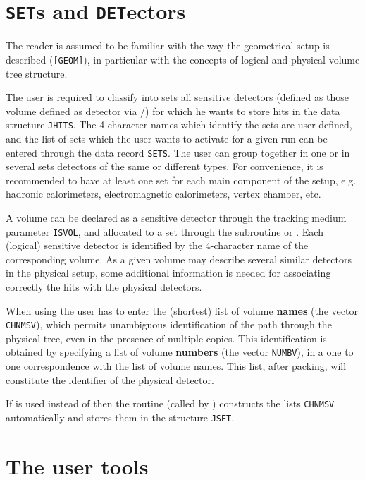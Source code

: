 \section{{\tt SET}s and {\tt DET}ectors}

The reader is assumed to be familiar with the way the
geometrical setup is described ({\tt [GEOM]}), in particular
with the concepts of logical and physical volume tree structure.

The user is required to classify into sets all sensitive detectors
(defined as those volume defined as detector via /)
for which he wants to store hits in the data structure {\tt JHITS}.
The 4-character names which identify the sets are user defined,
and the list of sets
which the user wants to activate for a given run can be entered
through the data record {\tt SETS}.
The user can group together in one or in several sets
detectors of the same or different types. For convenience,
it is recommended to have at least one set for
each main component of the setup, e.g. hadronic calorimeters,
electromagnetic calorimeters, vertex chamber, etc.

A volume can be declared as a sensitive detector through the tracking
medium parameter {\tt ISVOL},
and allocated to a set through the subroutine  or
.
Each (logical) sensitive detector is identified by the 4-character
name of the corresponding volume. As a given volume
may describe several similar detectors in the physical setup,
some additional information is needed for associating
correctly the hits with the physical detectors.

When using  the user has to enter the (shortest) list of volume
{\bf names} (the vector {\tt CHNMSV}), which permits unambiguous
identification of the path through the physical tree,
even in the presence of multiple copies.
This identification is obtained by specifying a list of volume
{\bf numbers} (the vector {\tt NUMBV}), in a one to one
correspondence with the list of volume names.
This list, after packing, will constitute the
identifier of the physical detector.

If  is used instead of
 then the routine
 (called by ) constructs the lists
{\tt CHNMSV} automatically and stores them in the structure {\tt JSET}.

\section{The user tools}
 

